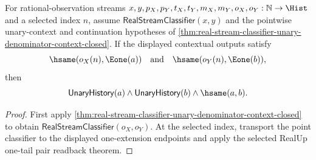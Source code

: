 \begin{theorem}
\label{thm:real-stream-classifier-unary-denominator-context-e1-pair-readback}
For rational-observation streams
$x,y,p_X,p_Y,t_X,t_Y,m_X,m_Y,o_X,o_Y:\mathbb{N}\to\Hist$ and a selected
index $n$, assume $\mathsf{RealStreamClassifier}(x,y)$ and the pointwise
unary-context and continuation hypotheses of
\autoref{thm:real-stream-classifier-unary-denominator-context-closed}. If the
displayed contextual outputs satisfy
$$
\hsame(o_X(n),\Eone(a))\quad\text{and}\quad \hsame(o_Y(n),\Eone(b)),
$$
then
$$
\mathsf{UnaryHistory}(a)\land\mathsf{UnaryHistory}(b)\land\hsame(a,b).
$$
\end{theorem}
\begin{proof}
First apply
\autoref{thm:real-stream-classifier-unary-denominator-context-closed} to obtain
$\mathsf{RealStreamClassifier}(o_X,o_Y)$. At the selected index, transport the
point classifier to the displayed one-extension endpoints and apply the
selected RealUp one-tail pair readback theorem.
\end{proof}

